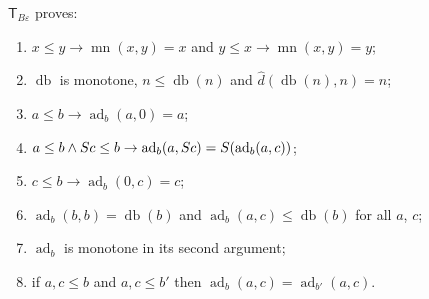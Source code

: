 \begin{lemma}\label{seed:lem:tbe-add}
$\mathsf{T}_{B\varepsilon}$ proves:
\begin{enumerate}[label=(\alph*),nosep]
\item $x\leq y\to\operatorname{mn}(x,y)=x$ and
$y\leq x\to\operatorname{mn}(x,y)=y$;
\item $\operatorname{db}$ is monotone, $n\leq\operatorname{db}(n)$ and
$\widehat d(\operatorname{db}(n),n)=n$;
\item $a\leq b\to\operatorname{ad}_b(a,0)=a$;
\item $a\leq b\land S c\leq b\to
\operatorname{ad}_b(a,S c)=S(\operatorname{ad}_b(a,c))$;
\item $c\leq b\to\operatorname{ad}_b(0,c)=c$;
\item $\operatorname{ad}_b(b,b)=\operatorname{db}(b)$ and
$\operatorname{ad}_b(a,c)\leq\operatorname{db}(b)$ for all $a$, $c$;
\item $\operatorname{ad}_b$ is monotone in its second argument;
\item if $a,c\leq b$ and $a,c\leq b'$ then
$\operatorname{ad}_b(a,c)=\operatorname{ad}_{b'}(a,c)$.
\end{enumerate}
\end{lemma}

